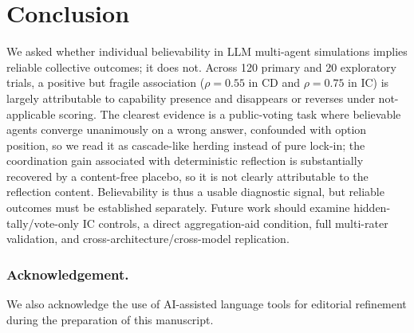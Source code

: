 \documentclass[runningheads]{llncs}
\begin{document}
\section{Conclusion}\label{sec:conclusion}
We asked whether individual believability in LLM multi-agent simulations implies reliable collective outcomes; it does not. Across 120 primary and 20 exploratory trials, a positive but fragile association ($\rho=0.55$ in CD and $\rho=0.75$ in IC) is largely attributable to capability presence and disappears or reverses under not-applicable scoring. The clearest evidence is a public-voting task where believable agents converge unanimously on a wrong answer, confounded with option position, so we read it as cascade-like herding instead of pure lock-in; the coordination gain associated with deterministic reflection is substantially recovered by a content-free placebo, so it is not clearly attributable to the reflection content. Believability is thus a usable diagnostic signal, but reliable outcomes must be established separately. Future work should examine hidden-tally/vote-only IC controls, a direct aggregation-aid condition, full multi-rater validation, and cross-architecture/cross-model replication.

\subsubsection*{Acknowledgement.} We also acknowledge the use of AI-assisted language tools for
editorial refinement during the preparation of this manuscript.
\end{document}
